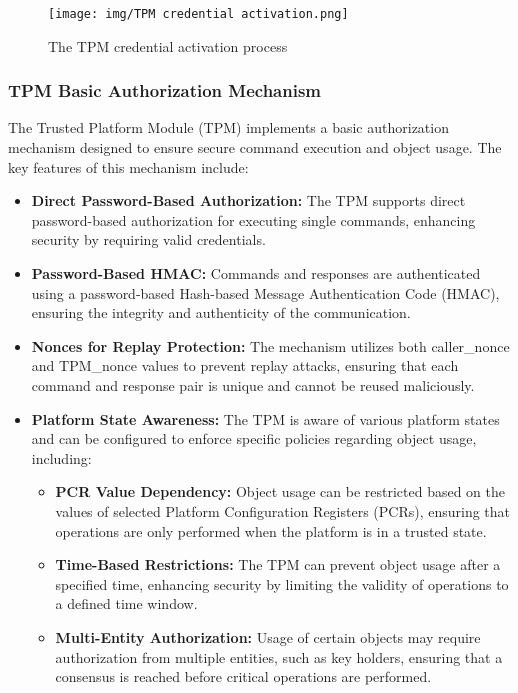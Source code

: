 \begin{figure}[H]
  \centering
  \texttt{[image: img/TPM credential
  activation.png]}
  \caption{The TPM credential activation process}
\end{figure}

\subsubsection{TPM Basic Authorization Mechanism}

The Trusted Platform Module (TPM) implements a basic authorization
mechanism designed to ensure secure command execution and object
usage. The key features of this mechanism include:

\begin{itemize}
    \item \textbf{Direct Password-Based Authorization:} The TPM
      supports direct password-based authorization for executing
      single commands, enhancing security by requiring valid
      credentials.
    
    \item \textbf{Password-Based HMAC:} Commands and responses are
      authenticated using a password-based Hash-based Message
      Authentication Code (HMAC), ensuring the integrity and
      authenticity of the communication.
    
    \item \textbf{Nonces for Replay Protection:} The mechanism
      utilizes both caller\_nonce and TPM\_nonce values to prevent
      replay attacks, ensuring that each command and response pair is
      unique and cannot be reused maliciously.
    
    \item \textbf{Platform State Awareness:} The TPM is aware of
      various platform states and can be configured to enforce
      specific policies regarding object usage, including:
    \begin{itemize}
        \item \textbf{PCR Value Dependency:} Object usage can be
          restricted based on the values of selected Platform
          Configuration Registers (PCRs), ensuring that operations are
          only performed when the platform is in a trusted state.
        
        \item \textbf{Time-Based Restrictions:} The TPM can prevent
          object usage after a specified time, enhancing security by
          limiting the validity of operations to a defined time
          window.
        
        \item \textbf{Multi-Entity Authorization:} Usage of certain
          objects may require authorization from multiple entities,
          such as key holders, ensuring that a consensus is reached
          before critical operations are performed.
    \end{itemize}
\end{itemize}


